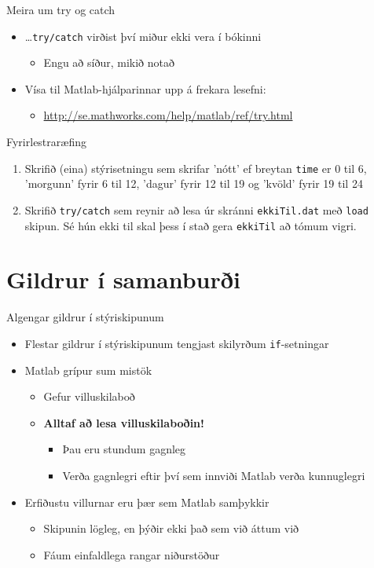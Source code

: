 \documentclass{beamer}
\begin{document}
\begin{frame}{Meira um try og catch}
\begin{itemize}
 \item \ldots \texttt{try/catch} virðist því miður ekki vera í bókinni
 \begin{itemize}
  \item Engu að síður, mikið notað
 \end{itemize}
 \item Vísa til Matlab-hjálparinnar upp á frekara lesefni:
 \begin{itemize}
  \item \url{http://se.mathworks.com/help/matlab/ref/try.html}
 \end{itemize}
\end{itemize}
\end{frame}

\begin{frame}{Fyrirlestraræfing}
\begin{enumerate}
 \item Skrifið (eina) stýrisetningu sem skrifar 'nótt' ef breytan \texttt{time} er 0 til 6, 'morgunn' fyrir 6 til 12, 'dagur' fyrir 12 til 19 og 'kvöld' fyrir 19 til 24
 \item Skrifið \texttt{try/catch} sem reynir að lesa úr skránni \texttt{ekkiTil.dat} með \texttt{load} skipun. Sé hún ekki til skal þess í stað gera \texttt{ekkiTil} að tómum vigri.
\end{enumerate}
\end{frame}

\section{Gildrur í samanburði}

\begin{frame}{Algengar gildrur í stýriskipunum}
\begin{itemize}
 \item Flestar gildrur í stýriskipunum tengjast skilyrðum \texttt{if}-setningar
 \item Matlab grípur sum mistök
 \begin{itemize}
  \item Gefur villuskilaboð
  \item \textbf{Alltaf að lesa villuskilaboðin!}
  \begin{itemize}
   \item Þau eru stundum gagnleg
   \item Verða gagnlegri eftir því sem innviði Matlab verða kunnuglegri
  \end{itemize}
 \end{itemize}
 \item Erfiðustu villurnar eru þær sem Matlab samþykkir
 \begin{itemize}
  \item Skipunin lögleg, en þýðir ekki það sem við áttum við
  \item Fáum einfaldlega rangar niðurstöður
 \end{itemize}
\end{itemize}
\end{frame}
\end{document}
